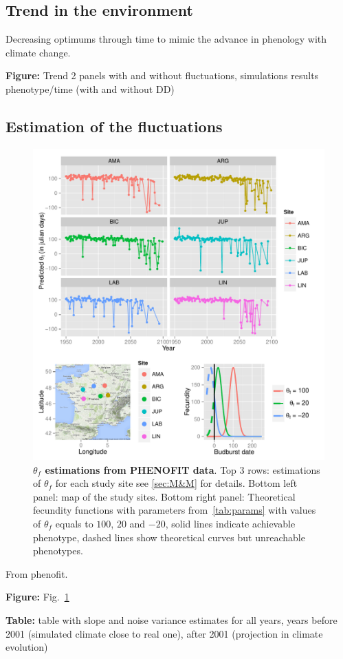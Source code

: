 \subsection*{Trend in the environment}

Decreasing optimums through time to mimic the advance in phenology with climate change.

\textbf{Figure:} Trend 2 panels with and without fluctuations, simulations results phenotype/time (with and without DD)

\subsection*{Estimation of the fluctuations}

\begin{figure}[ht!]
	\centering
	\includegraphics[scale=1]{Figures/optsmaps.pdf}
	\caption{\textbf{$\theta_{f}$ estimations from PHENOFIT data}. Top 3 rows: estimations of $\theta_f$ for each study site see \autoref{sec:M&M} for details. Bottom left panel: map of the study sites. Bottom right panel: Theoretical fecundity functions with parameters from~\autoref{tab:params} with values of $\theta_f$ equals to $100$, $20$ and $-20$, solid lines indicate achievable phenotype, dashed lines show theoretical curves but unreachable phenotypes.}
	\label{fig:thetaf}
\end{figure}

From phenofit.

\textbf{Figure:} Fig.~\ref{fig:thetaf}

\textbf{Table:} table with slope and noise variance estimates for all years, years before 2001 (simulated climate close to real one), after 2001 (projection in climate evolution)